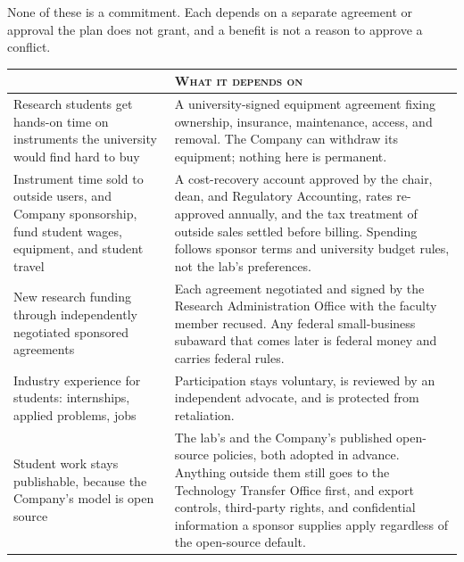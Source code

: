 \documentclass[11pt]{article}
\begin{document}

None of these is a commitment. Each depends on a separate agreement or
approval the plan does not grant, and a benefit is not a reason to approve a
conflict.

{\footnotesize
\setlength{\extrarowheight}{2pt}
\begin{tabularx}{\textwidth}{@{} >{\RaggedRight\arraybackslash}p{2.2in} >{\RaggedRight\arraybackslash}X @{}}
\toprule
{\color{byunavy}\scshape Possible benefit} &
{\color{byunavy}\scshape What it depends on} \\
\midrule
Research students get hands-on time on instruments the university would find
hard to buy &
A university-signed equipment agreement fixing ownership, insurance,
maintenance, access, and removal. The Company can withdraw its equipment;
nothing here is permanent. \\
\addlinespace
Instrument time sold to outside users, and Company sponsorship, fund student
wages, equipment, and student travel &
A cost-recovery account approved by the chair, dean, and Regulatory
Accounting, rates re-approved annually, and the tax treatment of outside sales
settled before billing. Spending follows sponsor terms and university budget
rules, not the lab's preferences. \\
\addlinespace
New research funding through independently negotiated sponsored agreements &
Each agreement negotiated and signed by the Research Administration Office
with the faculty member recused. Any federal small-business subaward that
comes later is federal money and carries federal rules. \\
\addlinespace
Industry experience for students: internships, applied problems, jobs &
Participation stays voluntary, is reviewed by an independent advocate, and is
protected from retaliation. \\
\addlinespace
Student work stays publishable, because the Company's model is open source &
The lab's and the Company's published open-source policies, both adopted in
advance. Anything outside them still goes to the Technology Transfer Office
first, and export controls, third-party rights, and confidential information a
sponsor supplies apply regardless of the open-source default. \\
\bottomrule
\end{tabularx}}

\end{document}
